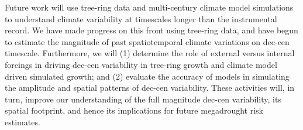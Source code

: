 \documentclass[phd,tocprelim]{cornell}
\begin{document}
Future work will use tree-ring data and multi-century climate model 
simulations to understand climate variability at timescales longer 
than the instrumental record. We have made progress on this front 
using tree-ring data, and have begun to estimate the magnitude of 
past spatiotemporal climate variations on dec-cen timescale. 
Furthermore, we will (1) determine the role of external versus 
internal forcings in driving dec-cen variability in tree-ring growth 
and climate model driven simulated growth; and (2) evaluate the 
accuracy of models in simulating the amplitude and spatial patterns 
of dec-cen variability. These activities will, in turn, improve 
our understanding of the full magnitude dec-cen variability, 
its spatial footprint, and hence its implications for future 
megadrought risk estimates.


%
 

\clearpage
\newpage



\begin{table}[!tbp]
\centering
{}
\caption{Synthetic dataset signals}
\label{synth:info}
\end{table}
\end{document}

